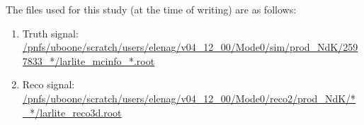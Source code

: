 \documentclass[a4paper, 10pt]{article}
\begin{document}
The files used for this study (at the time of writing) are as follows:
\begin{enumerate}[topsep=10pt,itemsep=-1ex,partopsep=10pt,parsep=1ex]
\item Truth signal: \url{/pnfs/uboone/scratch/users/elenag/v04_12_00/Mode0/sim/prod_NdK/2597833_*/larlite_mcinfo_*.root}
\item Reco signal: \url{/pnfs/uboone/scratch/users/elenag/v04_12_00/Mode0/reco2/prod_NdK/*_*/larlite_reco3d.root}
\end{enumerate}
\end{document}
